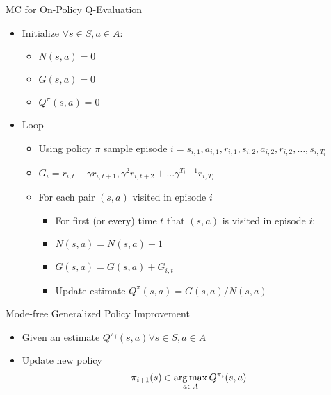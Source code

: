 \begin{frame}[c]{MC for On-Policy Q-Evaluation}
	
	\begin{itemize}
		\item Initialize $\forall s\in S, a\in A$:
		\begin{itemize}
			\item $N(s,a) = 0$
			\item $G(s,a) = 0$
			\item $Q^\pi(s,a) =0$
		\end{itemize}
		\item Loop
		\begin{itemize}
			\item Using policy $\pi$ sample episode $i = s_{i,1}, a_{i,1}, r_{i,1}, s_{i,2}, a_{i,2}, r_{i,2}, \ldots, s_{i, T_i}$
			\item $G_i = r_{i,t} + \gamma r_{i,t+1}, \gamma^2 r_{i,t+2} + \ldots \gamma^{T_i -1} r_{i,T_i}$
			\item For each pair $(s,a)$ visited in episode $i$
			\begin{itemize}
				\item For first (or every) time $t$ that $(s,a)$ is visited in episode $i$:
				\item $N(s,a) = N(s,a) + 1$
				\item $G(s,a) = G(s,a) + G_{i,t}$
				\item Update estimate $Q^\pi(s,a) = G(s,a) /N(s,a)$
			\end{itemize}
		\end{itemize}
	\end{itemize}
	
\end{frame}
\begin{frame}[c]{Mode-free Generalized Policy Improvement}
	
	\begin{itemize}
		\item Given an estimate $Q^{\pi_j}(s,a) \forall s\in S, a \in A$
		\item Update new policy
		$$\pi_{i+1}(s) \in \operatorname*{arg\,max}_{a \in A} Q^{\pi_i} (s,a) $$
	\end{itemize}
	
\end{frame}

